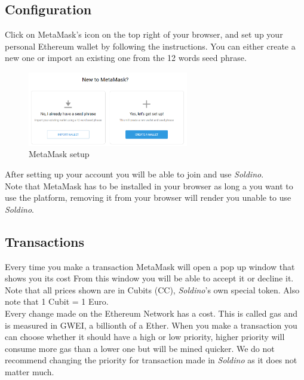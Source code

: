 	\subsection{Configuration}
	Click on MetaMask's icon on the top right of your browser, and set up your 
	personal Ethereum wallet by following the instructions. You can either 
	create a new one or import an existing one from the 12 words seed phrase.
	\begin{figure}[H]
		\includegraphics[width=7cm]{res/images/metamask_select.png}
		\centering
		\caption{MetaMask setup}
	\end{figure}
	\noindent After setting up your account you will be able to join and use 
	\textit{Soldino}.
	\newline \\
	Note that MetaMask has to be installed in your browser as long a you want 
	to use the platform, removing it from your browser will render you unable 
	to use \textit{Soldino}.
	\subsection{Transactions}
	Every time you make a transaction MetaMask will open a pop up window that 
	shows you its cost %
	From this window you will be able to accept it or decline it.
	Note that all prices shown are in Cubits (CC), \textit{Soldino}'s own 
	special token. Also note that 1 Cubit = 1 Euro.\\
	Every change made on the Ethereum Network has a cost. This is called gas 
	and is measured in GWEI, a billionth of a Ether. When you make a 
	transaction you can choose whether it should have a high or low priority, 
	higher priority will consume more gas than a lower one but will be mined 
	quicker. We do not recommend changing the priority for transaction made 
	in \textit{Soldino} as it does not matter much.\\
